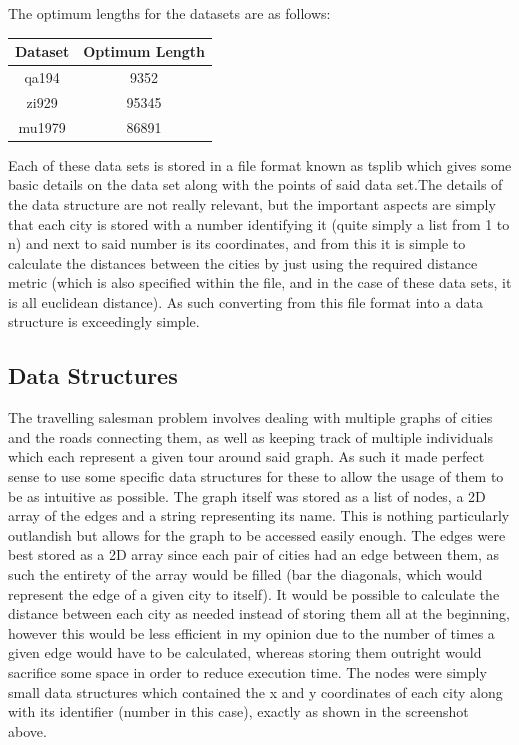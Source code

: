 \documentclass[11pt,a4paper,titlepage]{article}
\begin{document}
The optimum lengths for the datasets are as follows:

\begin{center}
\begin{tabular}{c | c}
Dataset & Optimum Length \\ [0.5ex]
\hline
	qa194 & 9352 \\
	zi929 & 95345 \\
	mu1979 & 86891
\end{tabular}
\end{center}

Each of these data sets is stored in a file format known as tsplib which gives some basic details on the data set along with the points of said data set.The details of the data structure are not really relevant, but the important aspects are simply that each city is stored with a number identifying it (quite simply a list from 1 to n) and next to said number is its coordinates, and from this it is simple to calculate the distances between the cities by just using the required distance metric (which is also specified within the file, and in the case of these data sets, it is all euclidean distance). As such converting from this file format into a data structure is exceedingly simple.

\subsection{Data Structures}

The travelling salesman problem involves dealing with multiple graphs of cities and the roads connecting them, as well as keeping track of multiple individuals which each represent a given tour around said graph. As such it made perfect sense to use some specific data structures for these to allow the usage of them to be as intuitive as possible. The graph itself was stored as a list of nodes, a 2D array of the edges and a string representing its name. This is nothing particularly outlandish but allows for the graph to be accessed easily enough. The edges were best stored as a 2D array since each pair of cities had an edge between them, as such the entirety of the array would be filled (bar the diagonals, which would represent the edge of a given city to itself). It would be possible to calculate the distance between each city as needed instead of storing them all at the beginning, however this would be less efficient in my opinion due to the number of times a given edge would have to be calculated, whereas storing them outright would sacrifice some space in order to reduce execution time. The nodes were simply small data structures which contained the x and y coordinates of each city along with its identifier (number in this case), exactly as shown in the screenshot above.
\end{document}
